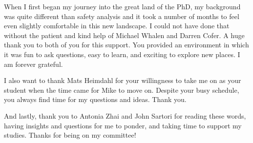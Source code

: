 When I first began my journey into the great land of the PhD, my background was quite different than safety analysis and it took a number of months to feel even slightly comfortable in this new landscape. I could not have done that without the patient and kind help of Michael Whalen and Darren Cofer. A huge thank you to both of you for this support. You provided an environment in which it was fun to ask questions, easy to learn, and exciting to explore new places. I am forever grateful. 

I also want to thank Mats Heimdahl for your willingness to take me on as your student when the time came for Mike to move on. Despite your busy schedule, you always find time for my questions and ideas. Thank you. 

And lastly, thank you to Antonia Zhai and John Sartori for reading these words, having insights and questions for me to ponder, and taking time to support my studies. Thanks for being on my committee!